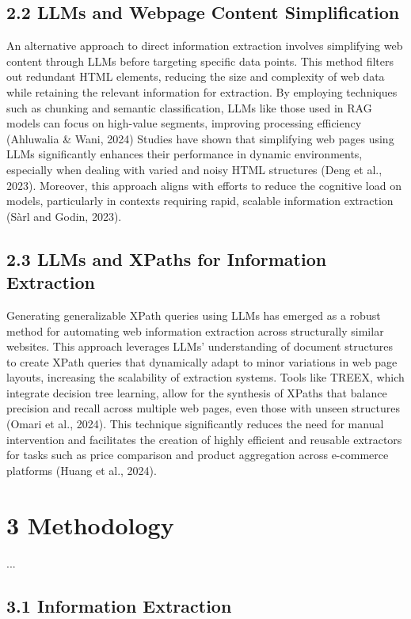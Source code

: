 \documentclass[a4paper]{article}
\begin{document}
\subsection{2.2 LLMs and Webpage Content Simplification}
An alternative approach to direct information extraction involves simplifying web content through LLMs before targeting specific data points. This method filters out redundant HTML elements, reducing the size and complexity of web data while retaining the relevant information for extraction. By employing techniques such as chunking and semantic classification, LLMs like those used in RAG models can focus on high-value segments, improving processing efficiency (Ahluwalia & Wani, 2024) Studies have shown that simplifying web pages using LLMs significantly enhances their performance in dynamic environments, especially when dealing with varied and noisy HTML structures (Deng et al., 2023). Moreover, this approach aligns with efforts to reduce the cognitive load on models, particularly in contexts requiring rapid, scalable information extraction (Sàrl and Godin, 2023).
\subsection{2.3 LLMs and XPaths for Information Extraction}
Generating generalizable XPath queries using LLMs has emerged as a robust method for automating web information extraction across structurally similar websites. This approach leverages LLMs’ understanding of document structures to create XPath queries that dynamically adapt to minor variations in web page layouts, increasing the scalability of extraction systems. Tools like TREEX, which integrate decision tree learning, allow for the synthesis of XPaths that balance precision and recall across multiple web pages, even those with unseen structures (Omari et al., 2024). This technique significantly reduces the need for manual intervention and facilitates the creation of highly efficient and reusable extractors for tasks such as price comparison and product aggregation across e-commerce platforms (Huang et al., 2024). 
\section{3 Methodology}

...

\subsection{3.1 Information Extraction }
\end{document}

